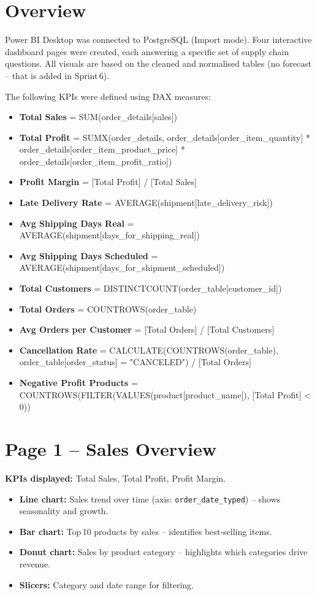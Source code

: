 \documentclass[12pt, a4paper]{report}
\begin{document}
\section{Overview}
Power BI Desktop was connected to PostgreSQL (Import mode). Four interactive dashboard pages were created, each answering a specific set of supply chain questions. All visuals are based on the cleaned and normalised tables (no forecast – that is added in Sprint 6).

The following KPIs were defined using DAX measures:

\begin{itemize}
   \item \textbf{Total Sales} = SUM(order\_details[sales])
   \item \textbf{Total Profit} = SUMX(order\_details, order\_details[order\_item\_quantity] * order\_details[order\_item\_product\_price] * order\_details[order\_item\_profit\_ratio])
   \item \textbf{Profit Margin} = [Total Profit] / [Total Sales]
   \item \textbf{Late Delivery Rate} = AVERAGE(shipment[late\_delivery\_risk])
   \item \textbf{Avg Shipping Days Real} = AVERAGE(shipment[days\_for\_shipping\_real])
   \item \textbf{Avg Shipping Days Scheduled} = AVERAGE(shipment[days\_for\_shipment\_scheduled])
   \item \textbf{Total Customers} = DISTINCTCOUNT(order\_table[customer\_id])
   \item \textbf{Total Orders} = COUNTROWS(order\_table)
   \item \textbf{Avg Orders per Customer} = [Total Orders] / [Total Customers]
   \item \textbf{Cancellation Rate} = CALCULATE(COUNTROWS(order\_table), order\_table[order\_status] = "CANCELED") / [Total Orders]
   \item \textbf{Negative Profit Products} = COUNTROWS(FILTER(VALUES(product[product\_name]), [Total Profit] < 0))
\end{itemize}

\section{Page 1 – Sales Overview}
\textbf{KPIs displayed:} Total Sales, Total Profit, Profit Margin.

\begin{itemize}
   \item \textbf{Line chart:} Sales trend over time (axis: \texttt{order\_date\_typed}) – shows seasonality and growth.
   \item \textbf{Bar chart:} Top 10 products by sales – identifies best‑selling items.
   \item \textbf{Donut chart:} Sales by product category – highlights which categories drive revenue.
   \item \textbf{Slicers:} Category and date range for filtering.
\end{itemize}
\end{document}
